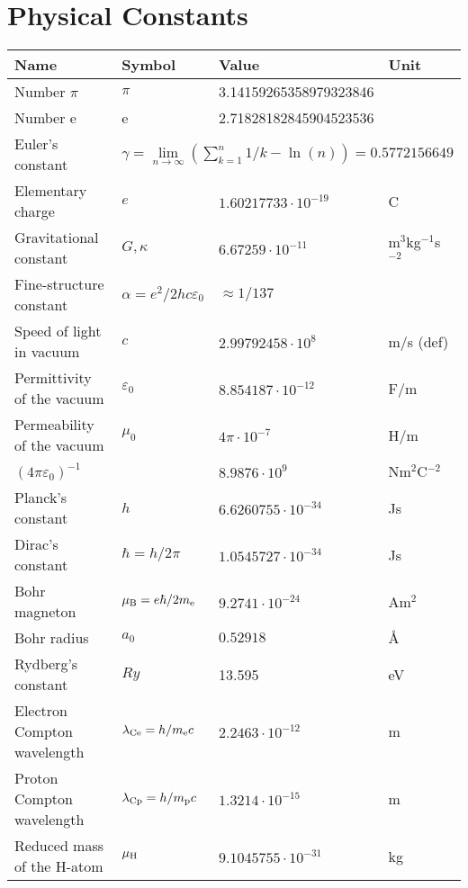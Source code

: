 \documentclass[a4paper]{report}
\begin{document}
\chapter*{\center Physical Constants}
\begin{center}
\begin{tabular}{||l|lll||}
\hline
{\bf Name}&{\bf Symbol}&{\bf Value}&{\bf Unit}\\
\hline
\hline
Number $\pi$                 &$\pi$&3.14159265358979323846&\\
Number e                     &e    &2.71828182845904523536&\\
Euler's constant &\multicolumn{3}{|l||}{$\gamma=\lim\limits_{n\rightarrow\infty}\left(\sum\limits_{k=1}^n 1/k-\ln(n)\right)=0.5772156649$}\\
\hline
Elementary charge            &$e$&$1.60217733\cdot10^{-19}$&C\rule{0pt}{13pt}\\
Gravitational constant       &$G,\kappa$&$6.67259\cdot10^{-11}$&m$^3$kg$^{-1}$s$^{-2}$\\
Fine-structure constant      &$\alpha=e^2/2hc\varepsilon_0$&$\approx1/137$&\\
Speed of light in vacuum     &$c$&$2.99792458\cdot10^8$&m/s (def)\\
Permittivity of the vacuum   &$\varepsilon_0$&$8.854187\cdot10^{-12}$&F/m\\
Permeability of the vacuum   &$\mu_0$&$4\pi\cdot10^{-7}$&H/m\\
$(4\pi\varepsilon_0)^{-1}$   &&$8.9876\cdot10^9$&Nm$^2$C$^{-2}$\\
\hline
Planck's constant            &$h$&$6.6260755\cdot10^{-34}$&Js\rule{0pt}{13pt}\\
Dirac's constant             &$\hbar=h/2\pi$&$1.0545727\cdot10^{-34}$&Js\\
Bohr magneton                &$\mu_{\rm B}=e\hbar/2m_{\rm e}$&$9.2741\cdot10^{-24}$&Am$^2$\\
Bohr radius                  &$a_0$&$0.52918$&\AA\\
Rydberg's constant           &$Ry$&13.595&eV\\
Electron Compton wavelength  &$\lambda_{\rm Ce}=h/m_{\rm e} c$&$2.2463\cdot10^{-12}$&m\\
Proton Compton wavelength    &$\lambda_{\rm Cp}=h/m_{\rm p}c$&$1.3214\cdot10^{-15}$&m\\
Reduced mass of the H-atom   &$\mu_{\rm H}$&$9.1045755\cdot10^{-31}$&kg\\

\end{tabular}
\end{center}
\end{document}
